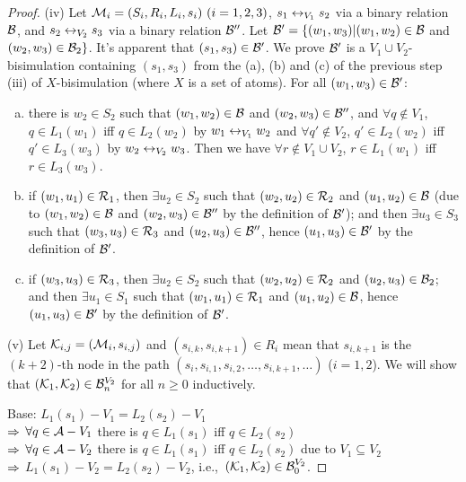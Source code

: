 \documentclass[letterpaper]{article} %
\begin{document}
\begin{proof}
(iv) Let ${\cal M}_i=(S_i,R_i,L_i,s_i)~(i=1,2,3)$, $s_1 \leftrightarrow_{V_1} s_2$ via a binary relation ${\cal B}$, and $s_2 \leftrightarrow_{V_2} s_3$ via a binary relation ${\cal B}''$. Let ${\cal B}' = \{(w_1, w_3)| (w_1, w_2)\in {\cal B}$ and $(w_2, w_3)\in {\cal B}_2\}$. It's apparent that $(s_1, s_3) \in {\cal B}'$. We prove ${\cal B}'$ is a $V_1 \cup V_2$-bisimulation containing $(s_1, s_3)$ from the (a), (b) and (c) of the previous step (iii) of $X$-bisimulation (where $X$ is a set of atoms). For all $(w_1, w_3) \in {\cal B}'$:
\begin{enumerate}[(a)]
  \item there is $w_2 \in S_2$ such that $(w_1,w_2)\in {\cal B}$ and $(w_2, w_3)\in {\cal B}''$, and $\forall q \notin V_1$, $q \in L_1(w_1)$ iff $q \in L_2(w_2)$ by $w_1 \leftrightarrow_{V_1} w_2$ and $\forall q' \notin V_2$, $q'\in L_2(w_2)$ iff $q'\in L_3(w_3)$ by $w_2 \leftrightarrow_{V_2} w_3$. Then we have $\forall r\notin V_1 \cup V_2$, $r \in L_1(w_1)$ iff $r \in L_3(w_3)$.
  \item if $(w_1, u_1) \in {\cal R}_1$, then $\exists u_2\in S_2$ such that $(w_2, u_2) \in {\cal R}_2$ and $(u_1,u_2)\in {\cal B}$ (due to $(w_1,w_2)\in {\cal B}$ and $(w_2, w_3) \in {\cal B}''$ by the definition of ${\cal B}'$); and then $\exists u_3 \in S_3$ such that $(w_3, u_3) \in {\cal R}_3$ and $(u_2, u_3) \in {\cal B}''$, hence $(u_1, u_3) \in {\cal B}'$ by the definition of ${\cal B}'$.
  \item if $(w_3, u_3) \in {\cal R}_3$, then $\exists u_2\in S_2$ such that $(w_2, u_2) \in {\cal R}_2$ and $(u_2, u_3) \in {\cal B}_2$; and then $\exists u_1 \in S_1$ such that $(w_1, u_1) \in {\cal R}_1$ and $(u_1, u_2) \in {\cal B}$, hence $(u_1, u_3) \in {\cal B}'$ by the definition of ${\cal B}'$.
\end{enumerate}

(v) Let ${\cal K}_{i, j}=({\cal M}_i, s_{i,j})$ and $(s_{i, k}, s_{i, k+1}) \in R_i$ mean that $s_{i, k+1}$ is the $(k+2)$-th node in the path
 $(s_i, s_{i, 1}, s_{i,2}, \dots , s_{i, k+1}, \dots)$ ($i=1,2$).
We will show that $({\cal K}_1, {\cal K}_2) \in {\cal B}_n^{V_2}$ for all $n \ge 0$ inductively.

Base: $L_1(s_1) - V_1 = L_2(s_2) - V_1$\\
$\Rightarrow$ $\forall q \in {\cal A} - V_1$ there is $q \in L_1(s_1)$ iff $q \in L_2(s_2)$\\
$\Rightarrow$ $\forall q \in {\cal A} - V_2$ there is $q \in L_1(s_1)$ iff $q \in L_2(s_2)$ due to $V_1 \subseteq V_2$\\
$\Rightarrow$ $L_1(s_1) - V_2 = L_2(s_2) - V_2$, i.e.,\ $({\cal K}_1, {\cal K}_2) \in {\cal B}_0^{V_2}$.


\end{proof}
\end{document}
